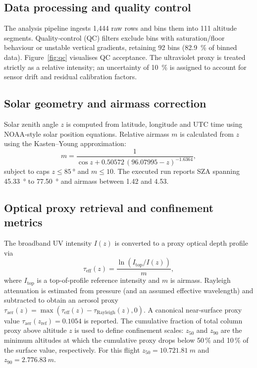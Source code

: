 \documentclass[11pt]{article}
\begin{document}
\subsection{Data processing and quality control}
The analysis pipeline ingests 1,444 raw rows and bins them into 111 altitude segments.  Quality‑control (QC) filters exclude bins with saturation/floor behaviour or unstable vertical gradients, retaining 92 bins (\SI{82.9}{\percent} of binned data).  Figure~\ref{fig:qc} visualises QC acceptance.  The ultraviolet proxy is treated strictly as a relative intensity; an uncertainty of 10~\% is assigned to account for sensor drift and residual calibration factors.

\subsection{Solar geometry and airmass correction}
Solar zenith angle $z$ is computed from latitude, longitude and UTC time using NOAA‑style solar position equations.  Relative airmass $m$ is calculated from $z$ using the Kasten–Young approximation:
\begin{equation}
m = \frac{1}{\cos z + 0.50572\,(96.07995 - z)^{-1.6364}},
\end{equation}
subject to caps $z\leq \SI{85}{\degree}$ and $m \leq 10$.  The executed run reports SZA spanning \SI{45.33}{\degree} to \SI{77.50}{\degree} and airmass between 1.42 and 4.53.

\subsection{Optical proxy retrieval and confinement metrics}
The broadband UV intensity $I(z)$ is converted to a proxy optical depth profile via
\begin{equation}
\tau_{\mathrm{eff}}(z) = \frac{\ln\left(I_{\mathrm{top}}/I(z)\right)}{m},
\end{equation}
where $I_{\mathrm{top}}$ is a top‑of‑profile reference intensity and $m$ is airmass.  Rayleigh attenuation is estimated from pressure (and an assumed effective wavelength) and subtracted to obtain an aerosol proxy $\tau_{\mathrm{aer}}(z)=\max(\tau_{\mathrm{eff}}(z) - \tau_{\mathrm{Rayleigh}}(z), 0)$.  A canonical near‑surface proxy value $\tau_{\mathrm{aer}}(z_{\mathrm{ref}})=0.1054$ is reported.  The cumulative fraction of total column proxy above altitude $z$ is used to define confinement scales: $z_{50}$ and $z_{90}$ are the minimum altitudes at which the cumulative proxy drops below 50\,\% and 10\,\% of the surface value, respectively.  For this flight $z_{50}=\SI{10,721.81}{m}$ and $z_{90}=\SI{2,776.83}{m}$.
\end{document}
